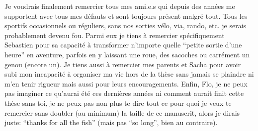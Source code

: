 Je voudrais finalement remercier tous mes ami.e.s qui depuis des années me supportent avec tous mes défauts et sont toujours présent malgré tout.
Tous les sportifs occasionnels ou réguliers, sans nos sorties vélo, via, rando, etc. je serais probablement devenu fou.
Parmi eux je tiens à remercier spécifiquement Sebastien pour sa capacité à transformer n'importe quelle “petite sortie d'une heure” en aventure, parfois en y laissant une roue, des sacoches ou carrément un genou (encore un).
Je tiens aussi à remercier mes parents et Sacha pour avoir subi mon incapacité à organiser ma vie hors de la thèse sans jamais se plaindre ni m'en tenir rigueur mais aussi pour leurs encouragements.
Enfin, Flo, je ne peux pas imaginer ce qu'aurai été ces dernières années ni comment aurait finit cette thèse sans toi, je ne peux pas non plus te dire tout ce pour quoi je veux te remercier sans doubler (au minimum) la taille de ce manuscrit, alors je dirais juste: “thanks for all the fish” (mais pas “so long”, bien au contraire).

\glsresetall
